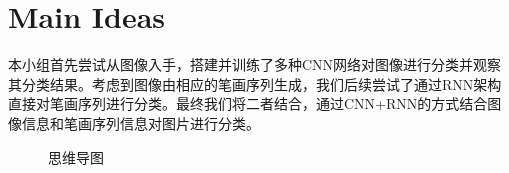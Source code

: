 \section{Main Ideas}
本小组首先尝试从图像入手，搭建并训练了多种CNN网络对图像进行分类并观察其分类结果。考虑到图像由相应的笔画序列生成，我们后续尝试了通过RNN架构直接对笔画序列进行分类。最终我们将二者结合，通过CNN+RNN的方式结合图像信息和笔画序列信息对图片进行分类。

\begin{figure}[ht]
    \centering
    \scalebox{0.7}{
    
    }
    \caption{思维导图}
    \label{fig:mindmap}
\end{figure}